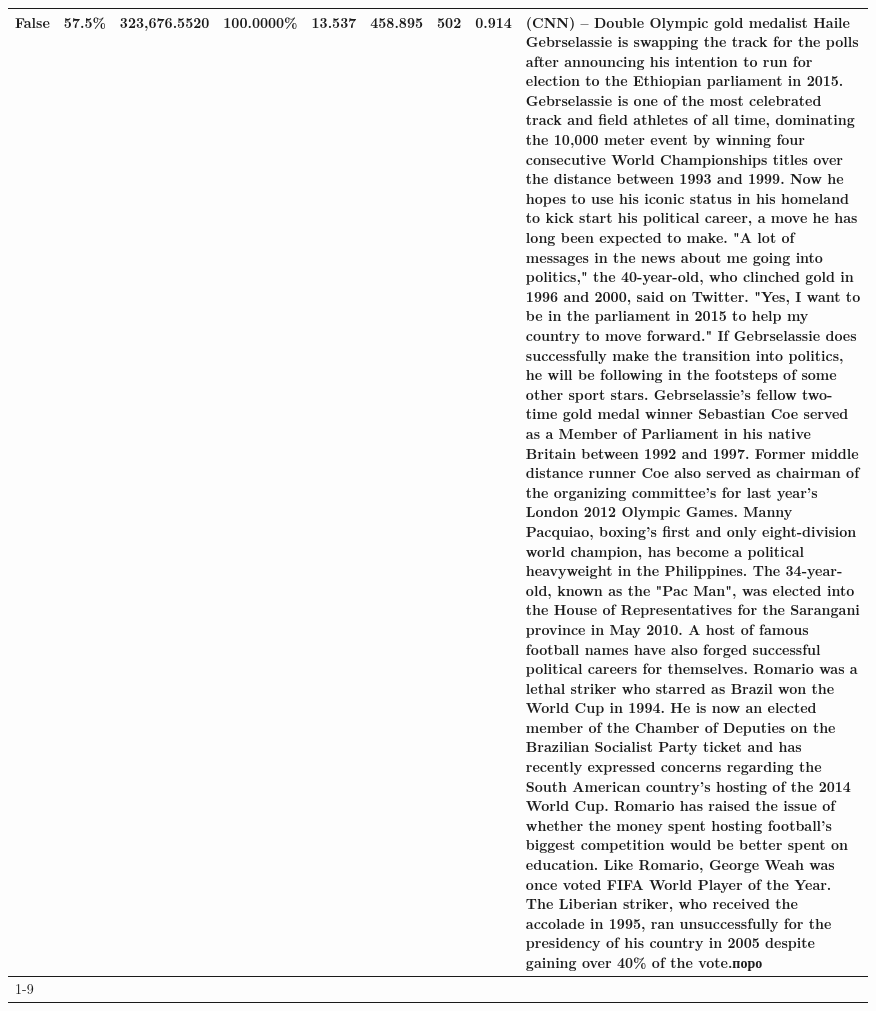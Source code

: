 \begin{table}[H]
{\begin{tabular}{lllrlllll}
False & 57.5\% & 323,676.5520 & \bfseries \color{red} 100.0000\% & 13.537 & 458.895 & 502 & 0.914 & (CNN) -- Double Olympic gold medalist Haile Gebrselassie is swapping the track for the polls after announcing his intention to run for election to the Ethiopian parliament in 2015. Gebrselassie is one of the most celebrated track and field athletes of all time, dominating the 10,000 meter event by winning four consecutive World Championships titles over the distance between 1993 and 1999. Now he hopes to use his iconic status in his homeland to kick start his political career, a move he has long been expected to make. "A lot of messages in the news about me going into politics," the 40-year-old, who clinched gold in 1996 and 2000, said on Twitter. "Yes, I want to be in the parliament in 2015 to help my country to move forward." If Gebrselassie does successfully make the transition into politics, he will be following in the footsteps of some other sport stars. Gebrselassie's fellow two-time gold medal winner Sebastian Coe served as a Member of Parliament in his native Britain between 1992 and 1997. Former middle distance runner Coe also served as chairman of the organizing committee's for last year's London 2012 Olympic Games. Manny Pacquiao, boxing's first and only eight-division world champion, has become a political heavyweight in the Philippines. The 34-year-old, known as the "Pac Man", was elected into the House of Representatives for the Sarangani province in May 2010. A host of famous football names have also forged successful political careers for themselves. Romario was a lethal striker who starred as Brazil won the World Cup in 1994. He is now an elected member of the Chamber of Deputies on the Brazilian Socialist Party ticket and has recently expressed concerns regarding the South American country's hosting of the 2014 World Cup. Romario has raised the issue of whether the money spent hosting football's biggest competition would be better spent on education. Like Romario, George Weah was once voted FIFA World Player of the Year. The Liberian striker, who received the accolade in 1995, ran unsuccessfully for the presidency of his country in 2005 despite gaining over 40\% of the vote.поро \\
\cline{1-9}

\end{tabular}}
\end{table}
